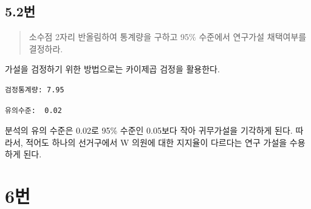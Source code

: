 \documentclass[
  letterpaper,
  DIV=11,
  numbers=noendperiod]{scrreprt}
\newenvironment{Shaded}{\begin{snugshade}}{\end{snugshade}}
\newcommand{\DecValTok}[1]{\textcolor[rgb]{0.68,0.00,0.00}{#1}}
\newcommand{\FunctionTok}[1]{\textcolor[rgb]{0.28,0.35,0.67}{#1}}
\newcommand{\NormalTok}[1]{\textcolor[rgb]{0.00,0.23,0.31}{#1}}
\newcommand{\OtherTok}[1]{\textcolor[rgb]{0.00,0.23,0.31}{#1}}
\newcommand{\SpecialCharTok}[1]{\textcolor[rgb]{0.37,0.37,0.37}{#1}}
\newcommand{\StringTok}[1]{\textcolor[rgb]{0.13,0.47,0.30}{#1}}
\begin{document}
\hypertarget{uxbc88-31}{%
\section*{5.2번}\label{uxbc88-31}}


\begin{quote}
소수점 2자리 반올림하여 통계량을 구하고 95\% 수준에서 연구가설
채택여부를 결정하라.
\end{quote}

가설을 검정하기 위한 방법으로는 카이제곱 검정을 활용한다.

\begin{Shaded}
\end{Shaded}

\begin{verbatim}
검정통계량: 7.95
\end{verbatim}

\begin{Shaded}
\end{Shaded}

\begin{verbatim}
유의수준:  0.02
\end{verbatim}

분석의 유의 수준은 0.02로 95\% 수준인 0.05보다 작아 귀무가설을 기각하게
된다. 따라서, 적어도 하나의 선거구에서 W 의원에 대한 지지율이 다르다는
연구 가설을 수용하게 된다.

\hypertarget{uxbc88-32}{%
\chapter*{6번}\label{uxbc88-32}}

\end{document}
